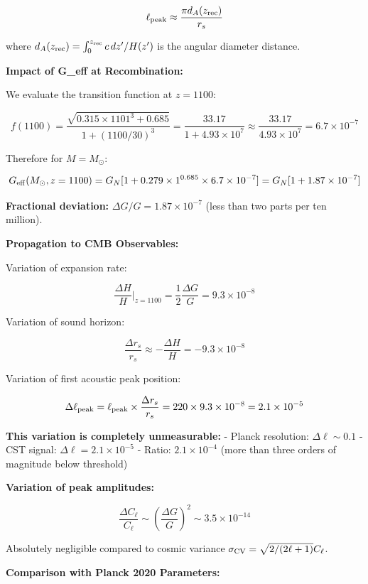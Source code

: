 \documentclass[10pt,a4paper]{article}
\begin{document}
\[\ell_{\rm peak} \approx \frac{\pi d_A(z_{\rm rec})}{r_s}\]

where \(d_A(z_{\rm rec}) = \int_0^{z_{\rm rec}} c\, dz'/H(z')\) is the
angular diameter distance.

\textbf{Impact of G\_eff at Recombination:}

We evaluate the transition function at \(z = 1100\):

\[f(1100) = \frac{\sqrt{0.315 \times 1101^3 + 0.685}}{1 + (1100/30)^3} = \frac{33.17}{1 + 4.93\times10^7} \approx \frac{33.17}{4.93\times10^7} = 6.7 \times 10^{-7}\]

Therefore for \(M = M_\odot\):

\[G_{\rm eff}(M_\odot, z=1100) = G_N [1 + 0.279 \times 1^{0.685} \times 6.7\times10^{-7}] = G_N [1 + 1.87\times10^{-7}]\]

\textbf{Fractional deviation:} \(\Delta G/G = 1.87 \times 10^{-7}\)
(less than two parts per ten million).

\textbf{Propagation to CMB Observables:}

Variation of expansion rate:

\[\frac{\Delta H}{H}\bigg|_{z=1100} = \frac{1}{2}\frac{\Delta G}{G} = 9.3\times10^{-8}\]

Variation of sound horizon:

\[\frac{\Delta r_s}{r_s} \approx -\frac{\Delta H}{H} = -9.3\times10^{-8}\]

Variation of first acoustic peak position:

\[\Delta\ell_{\rm peak} = \ell_{\rm peak} \times \frac{\Delta r_s}{r_s} = 220 \times 9.3\times10^{-8} = 2.1\times10^{-5}\]

\textbf{This variation is completely unmeasurable:} - Planck resolution:
\(\Delta\ell \sim 0.1\) - CST signal: \(\Delta\ell = 2.1\times10^{-5}\)
- Ratio: \(2.1\times10^{-4}\) (more than three orders of magnitude below
threshold)

\textbf{Variation of peak amplitudes:}

\[\frac{\Delta C_\ell}{C_\ell} \sim \left(\frac{\Delta G}{G}\right)^2 \sim 3.5 \times 10^{-14}\]

Absolutely negligible compared to cosmic variance
\(\sigma_{\rm CV} = \sqrt{2/(2\ell+1)} C_\ell\).

\textbf{Comparison with Planck 2020 \cite{PlanckCollaboration2020a} Parameters:}
\end{document}
